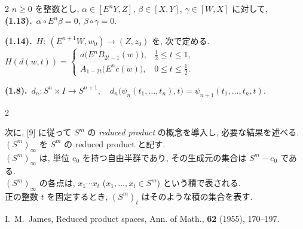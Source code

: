 \documentclass[10pt, leqno]{ltjsarticle} %
\newcommand{\Ex}{E}        %
\numberwithin{equation}{section}
\theoremstyle{plain}
\theoremstyle{definition}
\theoremstyle{remark}
\begin{document}
\begin{paracol}{2}
\noindent
$n\ge 0$ を整数とし, 
$\alpha\in[\Ex^n Y, Z]$, $\beta\in[X, Y]$, $\gamma\in[W, X]$ に対して,\\
\textbf{(1.13).}\
\(\alpha\circ \Ex^n\beta=0,\ \beta\circ \gamma=0\).

\noindent
\textbf{(1.14).}\ $H:\ (\Ex^{n+1}W,w_0)\to (Z,z_0)$ を, 次で定める. \\
\(
H(d(w,t))=
\begin{cases}
a\bigl(\Ex^n B_{2t-1}(w)\bigr), & \tfrac12\le t\le 1,\\[2mm]
A_{1-2t}\bigl(\Ex^n c(w)\bigr), & 0\le t\le \tfrac12.
\end{cases}
\)

\noindent
\textbf{(1.8).}\
\(d_n:S^n\times I\longrightarrow S^{n+1},\quad
d_n\bigl(\psi_n(t_1,\ldots,t_n),t\bigr)=\psi_{n+1}(t_1,\ldots,t_n,t).\)


\end{paracol}

\begin{paracol}{2}

次に, [9] に従って $S^m$ の \emph{reduced product} の概念を導入し, 
必要な結果を述べる. \\
$(S^m)_\infty$ を $S^m$ の reduced product と記す. \\
$(S^m)_\infty$ は, 単位 $e_0$ を持つ自由半群であり, 
その生成元の集合は $S^m-e_0$ である. \\
$(S^m)_\infty$ の各点は, 
$x_1\cdots x_t$ ($x_1,\ldots,x_t\in S^m$) という積で表される. \\
正の整数 $t$ を固定するとき, $(S^m)_t$ はそのような積の集合を表す. 

\switchcolumn

\noindent
\cite{James1955}
I.~M.~James,
\newblock Reduced product spaces,
\newblock Ann. of Math., {\bf 62} (1955), 170--197.
  
\end{paracol}
\end{document}

